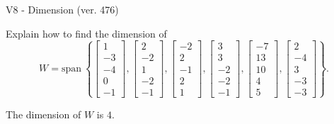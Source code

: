 \begin{exercise}
  \begin{exerciseTitle}V8 - Dimension (ver. 476)\end{exerciseTitle}
  \begin{exerciseStatement}
    Explain how to find the dimension of 
\[W=\mathrm{span}\ \left\{\left[\begin{array}{r}
1 \\
-3 \\
-4 \\
0 \\
-1
\end{array}\right] , \left[\begin{array}{r}
2 \\
-2 \\
1 \\
-2 \\
-1
\end{array}\right] , \left[\begin{array}{r}
-2 \\
2 \\
-1 \\
2 \\
1
\end{array}\right] , \left[\begin{array}{r}
3 \\
3 \\
-2 \\
-2 \\
-1
\end{array}\right] , \left[\begin{array}{r}
-7 \\
13 \\
10 \\
4 \\
5
\end{array}\right] , \left[\begin{array}{r}
2 \\
-4 \\
3 \\
-3 \\
-3
\end{array}\right]\right\}.\]



  \end{exerciseStatement}
  \begin{exerciseAnswer}
   The dimension of \(W\) is  \(4\).
  


  \end{exerciseAnswer}
\end{exercise}